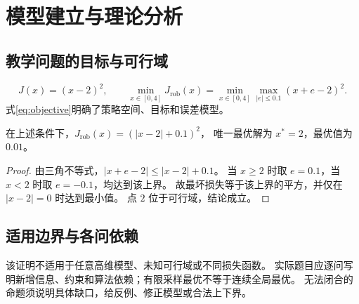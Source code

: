 \section{模型建立与理论分析}
\subsection{教学问题的目标与可行域}
\begin{equation}
\label{eq:objective}
  J(x)=(x-2)^2,\qquad
  \min_{x\in[0,4]} J_{\mathrm{rob}}(x)
  =\min_{x\in[0,4]}\max_{|e|\leq0.1}(x+e-2)^2.
\end{equation}
式\eqref{eq:objective}明确了策略空间、目标和误差模型。

\begin{proposition}
在上述条件下，$J_{\mathrm{rob}}(x)=(|x-2|+0.1)^2$，
唯一最优解为 $x^*=2$，最优值为 $0.01$。
\end{proposition}
\begin{proof}
由三角不等式，$|x+e-2|\leq|x-2|+0.1$。
当 $x\geq2$ 时取 $e=0.1$，当 $x<2$ 时取 $e=-0.1$，均达到该上界。
故最坏损失等于该上界的平方，并仅在 $|x-2|=0$ 时达到最小值。
点 $2$ 位于可行域，结论成立。
\end{proof}

\subsection{适用边界与各问依赖}
该证明不适用于任意高维模型、未知可行域或不同损失函数。
实际题目应逐问写明新增信息、约束和算法依赖；有限采样最优不等于连续全局最优。
无法闭合的命题须说明具体缺口，给反例、修正模型或合法上下界。
